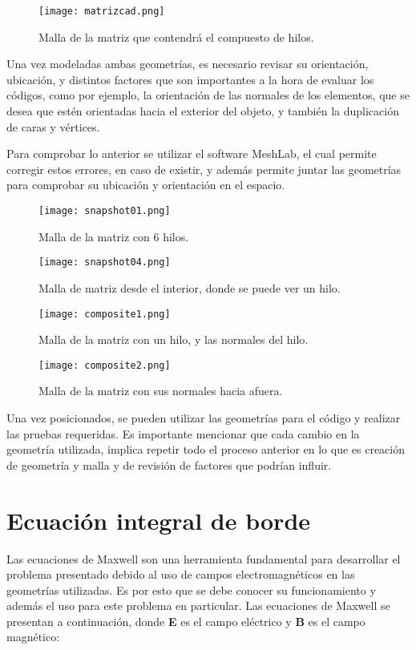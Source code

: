 \documentclass[12pt,letterpaper]{article}
\numberwithin{equation}{section}
\begin{document}
\begin{figure}[H]
	\centering\texttt{[image: matrizcad.png]}
	\caption{Malla de la matriz que contendrá el compuesto de hilos.}
\end{figure}

Una vez modeladas ambas geometrías, es necesario revisar su orientación, ubicación, y distintos factores que son importantes a la hora de evaluar los códigos, como por ejemplo, la orientación de las normales de los elementos, que se desea que estén orientadas hacia el exterior del objeto, y también la duplicación de caras y vértices.

Para comprobar lo anterior se utilizar el software MeshLab, el cual permite corregir estos errores, en caso de existir, y además permite juntar las geometrías para comprobar su ubicación y orientación en el espacio.

\begin{figure}[H]
	\centering\texttt{[image: snapshot01.png]}
	\caption{Malla de la matriz con 6 hilos.}
\end{figure}

\begin{figure}[H]
	\centering\texttt{[image: snapshot04.png]}
	\caption{Malla de matriz desde el interior, donde se puede ver un hilo.}
\end{figure}

\begin{figure}[H]
	\centering\texttt{[image: composite1.png]}
	\caption{Malla de la matriz con un hilo, y las normales del hilo.}
\end{figure}

\begin{figure}[H]
	\centering\texttt{[image: composite2.png]}
	\caption{Malla de la matriz con sus normales hacia afuera.}
\end{figure}

Una vez posicionados, se pueden utilizar las geometrías para el código y realizar las pruebas requeridas. Es importante mencionar que cada cambio en la geometría utilizada, implica repetir todo el proceso anterior en lo que es creación de geometría y malla y de revisión de factores que podrían influir.

\section{Ecuación integral de borde}


Las ecuaciones de Maxwell son una herramienta fundamental para desarrollar el problema presentado debido al uso de campos electromagnéticos en las geometrías utilizadas. Es por esto que se debe conocer su funcionamiento y además el uso para este problema en particular. Las ecuaciones de Maxwell se presentan a continuación, donde \textbf{E} es el campo eléctrico y \textbf{B} es el campo magnético:
\end{document}
